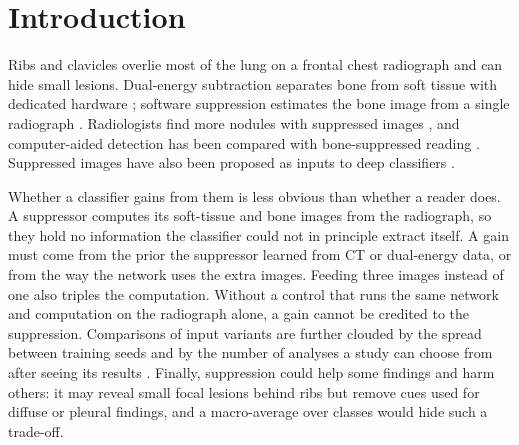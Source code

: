 \section{Introduction}
\label{sec:cls_intro}
Ribs and clavicles overlie most of the lung on a frontal chest radiograph and can hide small lesions. Dual-energy subtraction separates
bone from soft tissue with dedicated hardware \citep{kuhlman2006des}; software suppression estimates the bone image from a single radiograph
\citep{suzuki2006mtann,hogeweg2013suppression,yang2017cascade,gusarev2017deep}. Radiologists find more nodules with suppressed images
\citep{freedman2011lung}, and computer-aided detection has been compared with bone-suppressed reading \citep{schalekamp2014cad}. Suppressed images
have also been proposed as inputs to deep classifiers \citep{rajaraman2021bone}.

Whether a classifier gains from them is less obvious than whether a reader does. A suppressor computes its soft-tissue and bone images from
the radiograph, so they hold no information the classifier could not in principle extract itself. A gain must come from the prior the
suppressor learned from CT or dual-energy data, or from the way the network uses the extra images. Feeding three images instead of one also
triples the computation. Without a control that runs the same network and computation on the radiograph alone, a gain cannot be credited to
the suppression. Comparisons of input variants are further clouded by the spread between training seeds and by the number of analyses a
study can choose from after seeing its results \citep{varoquaux2022failures,simmons2011falsepositive}. Finally, suppression could help some
findings and harm others: it may reveal small focal lesions behind ribs but remove cues used for diffuse or pleural findings, and a
macro-average over classes would hide such a trade-off.

